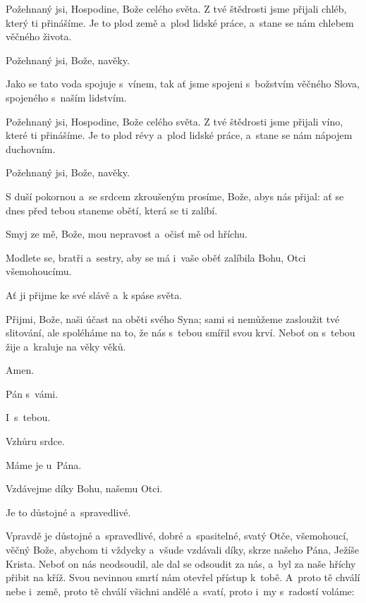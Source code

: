 Požehnaný jsi, Hospodine, Bože celého světa. Z tvé štědrosti jsme přijali chléb, který ti přinášíme. Je to plod země a~plod lidské práce, a~stane se nám chlebem věčného života.

\Rbardot{} Požehnaný jsi, Bože, navěky.

Jako se tato voda spojuje s~vínem, tak ať jsme spojeni s~božstvím věčného Slova, spojeného s~naším lidstvím.

Požehnaný jsi, Hospodine, Bože celého světa. Z tvé štědrosti jsme přijali víno, které ti přinášíme. Je to plod révy a~plod lidské práce, a~stane se nám nápojem duchovním.

\Rbardot{} Požehnaný jsi, Bože, navěky.

S duší pokornou a~se srdcem zkroušeným prosíme, Bože, abys nás přijal: ať se dnes před tebou staneme obětí, která se ti zalíbí.

Smyj ze mě, Bože, mou nepravost a~očisť mě od hříchu.

Modlete se, bratři a~sestry, aby se má i~vaše oběť zalíbila Bohu, Otci všemohoucímu.

\Rbardot{} Ať ji přijme ke své slávě a~k spáse světa.

\mbox{}

Přijmi, Bože, naši účast na oběti svého Syna; sami si nemůžeme zasloužit tvé slitování, ale spoléháme na to, že nás s~tebou smířil svou krví. Neboť on s~tebou žije a~kraluje na věky věků.

\Rbardot{} Amen.

\Vbardot{} Pán s~vámi.

\Rbardot{} I~s~tebou.

\Vbardot{} Vzhůru srdce.

\Rbardot{} Máme je u~Pána.

\Vbardot{} Vzdávejme díky Bohu, našemu Otci.

\Rbardot{} Je to důstojné a~spravedlivé.

\mbox{}

Vpravdě je důstojné a~spravedlivé, dobré a~spasitelné, svatý Otče, všemohoucí, věčný Bože, abychom ti vždycky a~všude vzdávali díky, skrze našeho Pána, Ježíše Krista. Neboť on nás neodsoudil, ale dal se odsoudit za nás, a~byl za naše hříchy přibit na kříž. Svou nevinnou smrtí nám otevřel přístup k~tobě. A~proto tě chválí nebe i~země, proto tě chválí všichni andělé a~svatí, proto i~my s~radostí voláme:
